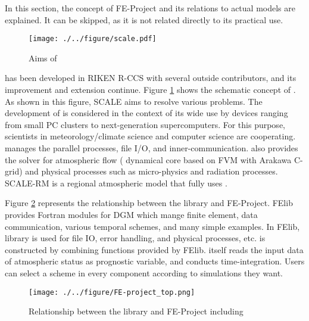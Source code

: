 In this section, 
the concept of FE-Project and its relations to actual models are explained. 
It can be skipped, as it is not related directly to its practical use.

\clearpage
{}

\begin{figure}[htb]
\begin{center}
  \texttt{[image: ./../figure/scale.pdf]}\\
  \caption{Aims of \scalelib}
  \label{fig:scale}
\end{center}
\end{figure}

\scalelib has been developed in RIKEN R-CCS with several outside contributors,
and its improvement and extension continue.
Figure \ref{fig:scale} shows the schematic concept of \scalelib.
As shown in this figure, SCALE aims to resolve various problems.
The development of \scalelib is considered in the context of its wide use
by devices ranging from small PC clusters to next-generation supercomputers.
For this purpose, scientists in meteorology/climate science
and computer science are cooperating.
\scalelib manages the parallel processes,
file I/O, and inner-communication.
\scalelib also provides the solver for atmospheric flow ( dynamical core based on FVM with Arakawa C-grid)
and physical processes such as micro-physics and radiation processes.
SCALE-RM is a regional atmospheric model that fully uses \scalelib.




Figure \ref{fig:FE-Project_relation} represents the relationship between the library \scalelib and FE-Project.
FElib provides Fortran modules for DGM which mange finite element, data communication, various temporal schemes, 
and many simple examples. 
In FElib, \scalelib library is used for file IO, error handling, and physical processes, etc.
\scaledg is constructed by combining functions provided by FElib.
\scaledg itself reads the input data of atmospheric status as prognostic variable,
and conducts time-integration.
Users can select a scheme in every component according to simulations they want.


\begin{figure}[hbt]
\begin{center}
  \texttt{[image: ./../figure/FE-project\_top.png]}\\
  \caption{Relationship between the library \scalelib and FE-Project including \scaledg}
  \label{fig:FE-Project_relation}
\end{center}
\end{figure}


